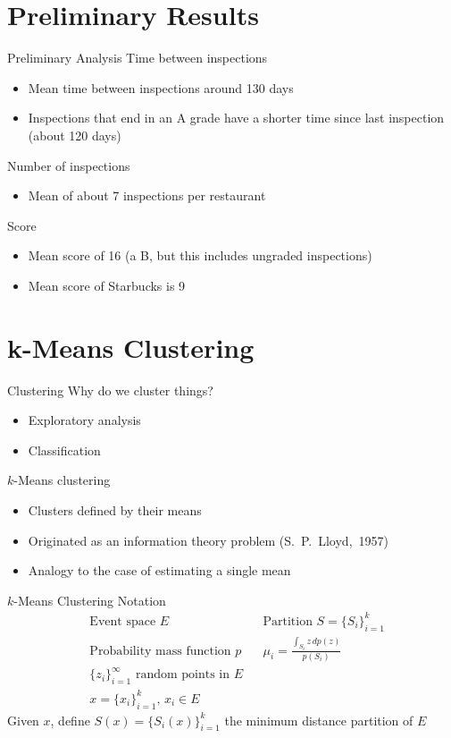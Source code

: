 \documentclass[12pt]{beamer}
\begin{document}
\section{Preliminary Results}
\begin{frame}{Preliminary Analysis}
\vfill
Time between inspections
\begin{itemize}
	\item Mean time between inspections around 130 days
	\item Inspections that end in an A grade have a shorter time since 
	last inspection (about 120 days)
\end{itemize}
\vfill
Number of inspections
\begin{itemize}
	\item Mean of about 7 inspections per restaurant
\end{itemize}
\vfill
Score
\begin{itemize}
	\item Mean score of 16 (a B, but this includes ungraded inspections)
	\item Mean score of Starbucks is 9
\end{itemize}
\vfill
\end{frame}

\section{k-Means Clustering}
\begin{frame}{Clustering}
\vfill
Why do we cluster things?
\begin{itemize}
	\item Exploratory analysis
	\item Classification
\end{itemize}
\vfill
$k$-Means clustering
\begin{itemize}
	\item Clusters defined by their means
	\item Originated as an information theory problem (S.~P.~Lloyd,~1957)
	\item Analogy to the case of estimating a single mean
\end{itemize}
\vfill
\end{frame}

\begin{frame}{$k$-Means Clustering}
\vfill
Notation
\begin{align*}
	&\text{Event space } E& &\text{Partition } S=\{S_i\}_{i=1}^k \\
	&\text{Probability mass function } p& &\mu_i = \frac{\int_{S_i} z\,dp(z)}{p(S_i)} \\
	&\{z_i\}_{i=1}^{\infty} \text{ random points in $E$}& \\
	&x = \{x_i\}_{i=1}^k,\,x_i \in E&
\end{align*}
Given $x$, define $S(x) = \{S_i(x)\}_{i=1}^k$ the minimum distance partition of $E$
\vfill
\end{frame}
\end{document}
